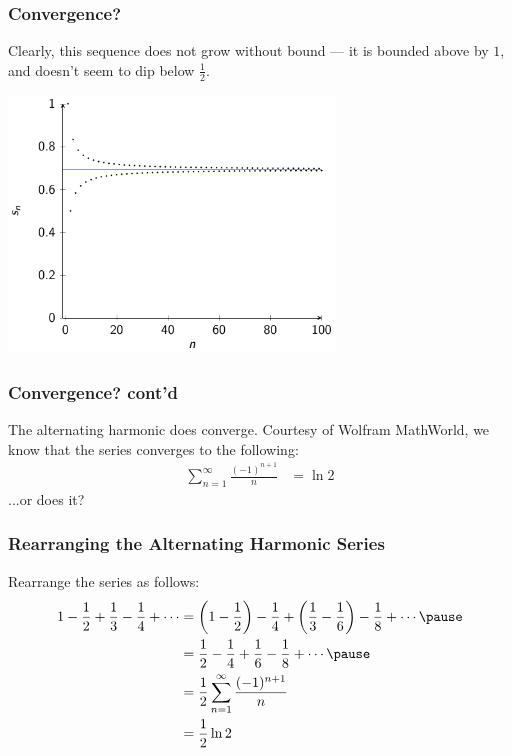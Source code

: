 \documentclass{beamer}
\begin{document}
\begin{frame}
  \frametitle{Convergence?}
  Clearly, this sequence does not grow without bound --- it is bounded above by $1$, and doesn't seem to dip below $\frac{1}{2}$.\pause
  \begin{center}
    \includegraphics[width=0.65\textwidth]{images/alternating_harmonic_series_plot.pdf}
  \end{center}
\end{frame}
\begin{frame}
  \frametitle{Convergence? cont'd}
  The alternating harmonic does converge. Courtesy of Wolfram MathWorld, we know that the series converges to the following:
  \begin{align*}
    \sum_{n=1}^{\infty}\frac{(-1)^{n+1}}{n} &= \ln 2
  \end{align*}\pause
  ...or does it? 
\end{frame}
\begin{frame}
  \frametitle{Rearranging the Alternating Harmonic Series}
  Rearrange the series as follows:
  \begin{align*}
    1 - \frac{1}{2} + \frac{1}{3} - \frac{1}{4} + \cdots &= \left(1-\frac{1}{2}\right) - \frac{1}{4} + \left(\frac{1}{3} - \frac{1}{6}\right) - \frac{1}{8} + \cdots\pause\\
                                                                       &= \frac{1}{2} - \frac{1}{4} + \frac{1}{6} - \frac{1}{8} + \cdots\pause\\
                                                                       &= \frac{1}{2}\sum_{n=1}^{\infty}\frac{(-1)^{n+1}}{n}\\
                                                                       &= \frac{1}{2}\ln 2
  \end{align*}
\end{frame}
\end{document}
